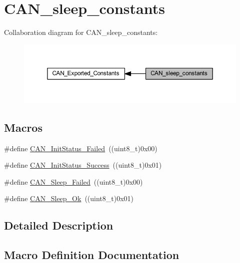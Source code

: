 \hypertarget{group___c_a_n__sleep__constants}{}\section{C\+A\+N\+\_\+sleep\+\_\+constants}
\label{group___c_a_n__sleep__constants}
Collaboration diagram for C\+A\+N\+\_\+sleep\+\_\+constants\+:
\nopagebreak
\begin{figure}[H]
\begin{center}
\leavevmode
\includegraphics[width=350pt]{group___c_a_n__sleep__constants}
\end{center}
\end{figure}
\subsection*{Macros}
\begin{DoxyCompactItemize}
\item 
\#define \hyperlink{group___c_a_n__sleep__constants_ga095c319e8c54c974eb2b6eeadf180d96}{C\+A\+N\+\_\+\+Init\+Status\+\_\+\+Failed}~((uint8\+\_\+t)0x00)
\item 
\#define \hyperlink{group___c_a_n__sleep__constants_ga6bed5957af8f2f6b00568e15ccac5772}{C\+A\+N\+\_\+\+Init\+Status\+\_\+\+Success}~((uint8\+\_\+t)0x01)
\item 
\#define \hyperlink{group___c_a_n__sleep__constants_ga169500ab7169c4e9c7e9e4ea34b3e070}{C\+A\+N\+\_\+\+Sleep\+\_\+\+Failed}~((uint8\+\_\+t)0x00)
\item 
\#define \hyperlink{group___c_a_n__sleep__constants_gaf5c4e9d32d4faff9d0bf61e153ed7998}{C\+A\+N\+\_\+\+Sleep\+\_\+\+Ok}~((uint8\+\_\+t)0x01)
\end{DoxyCompactItemize}


\subsection{Detailed Description}


\subsection{Macro Definition Documentation}
\mbox{\label{group___c_a_n__sleep__constants_ga095c319e8c54c974eb2b6eeadf180d96}} 
